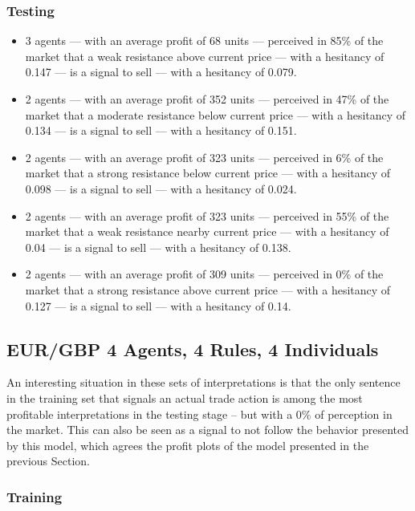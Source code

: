 \subsubsection{Testing}
\label{}

{\small
  \begin{itemize}
  \item 3 agents — with an average profit of 68 units — perceived in 85\% of the
    market that a weak resistance above current price — with a hesitancy of
    0.147 — is a signal to sell — with a hesitancy of 0.079.
  \item 2 agents — with an average profit of 352 units — perceived in 47\% of
    the market that a moderate resistance below current price — with a hesitancy
    of 0.134 — is a signal to sell — with a hesitancy of 0.151.
  \item 2 agents — with an average profit of 323 units — perceived in 6\% of the
    market that a strong resistance below current price — with a hesitancy of
    0.098 — is a signal to sell — with a hesitancy of 0.024.
  \item 2 agents — with an average profit of 323 units — perceived in 55\% of
    the market that a weak resistance nearby current price — with a hesitancy of
    0.04 — is a signal to sell — with a hesitancy of 0.138.
  \item 2 agents — with an average profit of 309 units — perceived in 0\% of the
    market that a strong resistance above current price — with a hesitancy of
    0.127 — is a signal to sell — with a hesitancy of 0.14.
  \end{itemize}
}

\subsection{EUR/GBP 4 Agents, 4 Rules, 4 Individuals}
\label{}

An interesting situation in these sets of interpretations is that the only
sentence in the training set that signals an actual trade action is among the
most profitable interpretations in the testing stage -- but with a 0\% of
perception in the market. This can also be seen as a signal to not follow the
behavior presented by this model, which agrees the profit plots of the model
presented in the previous Section.

\subsubsection{Training}
\label{}

